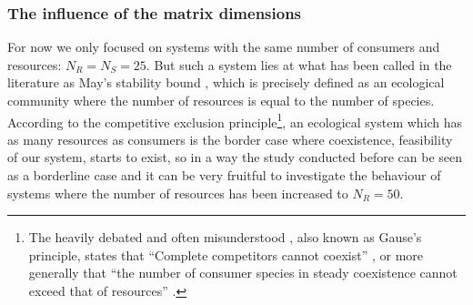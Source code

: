 \documentclass[12pt, titlepage]{report}
\begin{document}
\FloatBarrier
\subsubsection{The influence of the matrix dimensions}
For now we only focused on systems with the same number of consumers and resources: $N_R=N_S=25$. But such a system lies at what has been called in the literature as May's stability bound \cite{biroli_marginally_2018}, which is precisely defined as an ecological community where the number of resources is equal to the number of species. According to the competitive exclusion principle\footnote{The heavily debated and often misunderstood \cite{hardin_competitive_1960} , also known as Gause's principle, states that ``Complete competitors cannot coexist'' \cite{hardin_competitive_1960}, or more generally that ``the number of consumer species in steady coexistence cannot exceed that of resources'' \cite{wang_overcome_2019}.}, an ecological system which has as many resources as consumers is the border case where coexistence, \ie feasibility of our system, starts to exist, so in a way the study conducted before can be seen as a borderline case and it can be very fruitful to investigate the behaviour of systems where the number of resources has been increased to $N_R=50$.
\end{document}
